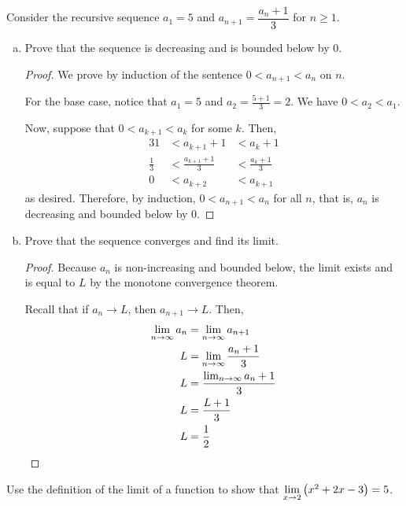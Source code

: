 \documentclass{agony}
\begin{document}
\question Consider the recursive sequence $a_1=5$ and $a_{n+1}=\dfrac{a_n+1}{3}$ for $n \geq 1$.
\begin{enumerate}[(a)]
  \item Prove that the sequence is decreasing and is bounded below by 0.
        \begin{proof}
          We prove by induction of the sentence $0<a_{n+1}<a_n$ on $n$.

          For the base case, notice that $a_1=5$ and $a_2=\frac{5+1}{3}=2$.
          We have $0 < a_2 < a_1$.

          Now, suppose that $0<a_{k+1}<a_k$ for some $k$. Then,
          \begin{alignat*}{3}
            1           & < a_{k+1}+1           & < a_k+1           \\
            \frac{1}{3} & < \frac{a_{k+1}+1}{3} & < \frac{a_k+1}{3} \\
            0           & < a_{k+2}             & < a_{k+1}
          \end{alignat*}
          as desired.
          Therefore, by induction, $0<a_{n+1}<a_n$ for all $n$, that is,
          $a_n$ is decreasing and bounded below by 0.
        \end{proof}
  \item Prove that the sequence converges and find its limit.
        \begin{proof}
          Because $a_n$ is non-increasing and bounded below, the limit exists and is equal to $L$ by the monotone convergence theorem.

          Recall that if $a_n \to L$, then $a_{n+1} \to L$. Then,
          \begin{align*}
            \lim_{n\to\infty} a_n & = \lim_{n\to\infty} a_{n+1}         \\
            L            & = \lim_{n\to\infty} \frac{a_n+1}{3} \\
            L            & = \frac{\lim_{n\to\infty}a_n+1}{3}  \\
            L            & = \frac{L+1}{3}            \\
            L            & = \frac{1}{2} \qedhere
          \end{align*}
        \end{proof}
\end{enumerate}


\question Use the \epsdel{} definition of the limit of a function to show that
$\lim\limits_{x\to2}\left(x^2+2x-3\right)=5$.
\end{document}
